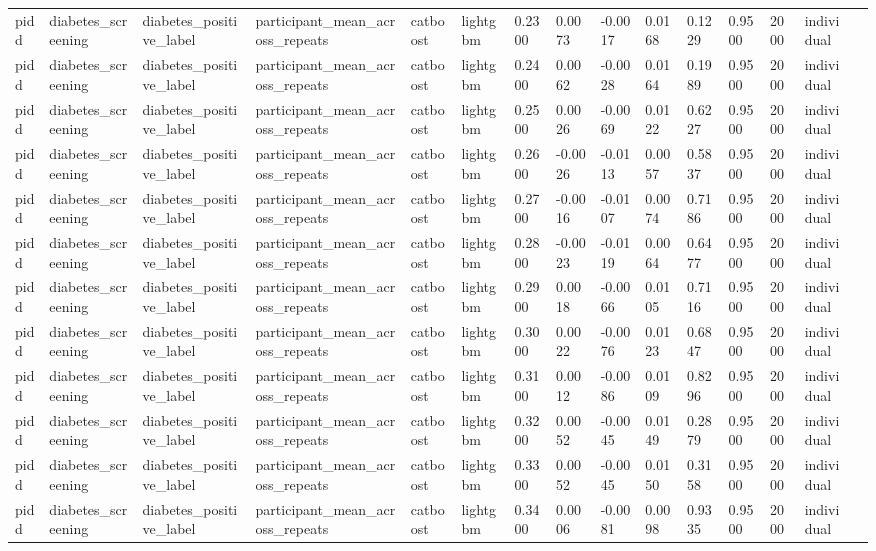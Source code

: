 \begin{tabular}{lllllllllllllll}
pidd & diabetes\_screening & diabetes\_positive\_label & participant\_mean\_across\_repeats & catboost & lightgbm & 0.2300 & 0.0073 & -0.0017 & 0.0168 & 0.1229 & 0.9500 & 2000 & individual &  \\
pidd & diabetes\_screening & diabetes\_positive\_label & participant\_mean\_across\_repeats & catboost & lightgbm & 0.2400 & 0.0062 & -0.0028 & 0.0164 & 0.1989 & 0.9500 & 2000 & individual &  \\
pidd & diabetes\_screening & diabetes\_positive\_label & participant\_mean\_across\_repeats & catboost & lightgbm & 0.2500 & 0.0026 & -0.0069 & 0.0122 & 0.6227 & 0.9500 & 2000 & individual &  \\
pidd & diabetes\_screening & diabetes\_positive\_label & participant\_mean\_across\_repeats & catboost & lightgbm & 0.2600 & -0.0026 & -0.0113 & 0.0057 & 0.5837 & 0.9500 & 2000 & individual &  \\
pidd & diabetes\_screening & diabetes\_positive\_label & participant\_mean\_across\_repeats & catboost & lightgbm & 0.2700 & -0.0016 & -0.0107 & 0.0074 & 0.7186 & 0.9500 & 2000 & individual &  \\
pidd & diabetes\_screening & diabetes\_positive\_label & participant\_mean\_across\_repeats & catboost & lightgbm & 0.2800 & -0.0023 & -0.0119 & 0.0064 & 0.6477 & 0.9500 & 2000 & individual &  \\
pidd & diabetes\_screening & diabetes\_positive\_label & participant\_mean\_across\_repeats & catboost & lightgbm & 0.2900 & 0.0018 & -0.0066 & 0.0105 & 0.7116 & 0.9500 & 2000 & individual &  \\
pidd & diabetes\_screening & diabetes\_positive\_label & participant\_mean\_across\_repeats & catboost & lightgbm & 0.3000 & 0.0022 & -0.0076 & 0.0123 & 0.6847 & 0.9500 & 2000 & individual &  \\
pidd & diabetes\_screening & diabetes\_positive\_label & participant\_mean\_across\_repeats & catboost & lightgbm & 0.3100 & 0.0012 & -0.0086 & 0.0109 & 0.8296 & 0.9500 & 2000 & individual &  \\
pidd & diabetes\_screening & diabetes\_positive\_label & participant\_mean\_across\_repeats & catboost & lightgbm & 0.3200 & 0.0052 & -0.0045 & 0.0149 & 0.2879 & 0.9500 & 2000 & individual &  \\
pidd & diabetes\_screening & diabetes\_positive\_label & participant\_mean\_across\_repeats & catboost & lightgbm & 0.3300 & 0.0052 & -0.0045 & 0.0150 & 0.3158 & 0.9500 & 2000 & individual &  \\
pidd & diabetes\_screening & diabetes\_positive\_label & participant\_mean\_across\_repeats & catboost & lightgbm & 0.3400 & 0.0006 & -0.0081 & 0.0098 & 0.9335 & 0.9500 & 2000 & individual &  \\

\end{tabular}
